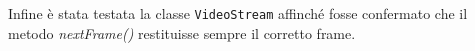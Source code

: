 \documentclass[a4paper,11pt]{article}
\begin{document}
	Infine è stata testata la classe \texttt{VideoStream} affinché fosse confermato che il metodo \textit{nextFrame()} restituisse sempre il corretto frame.
	
	
\end{document}
